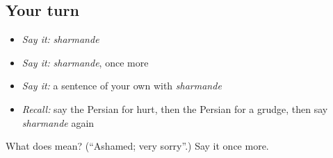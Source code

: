\subsection*{Your turn}
\begin{itemize}
\raggedright
  \item \emph{Say it:} \emph{sharmande}
  \item \emph{Say it:} \emph{sharmande}, once more
  \item \emph{Say it:} a sentence of your own with \emph{sharmande}
  \item \emph{Recall:} say the Persian for hurt, then the Persian for a grudge, then say \emph{sharmande} again
\end{itemize}

\begin{tcolorbox}[breakable,colback=teal!4,colframe=teal!35!black,title={Before you move on}]
What does  mean? (\textquotedblleft{}Ashamed; very sorry\textquotedblright{}.) Say it once more.
\end{tcolorbox}

